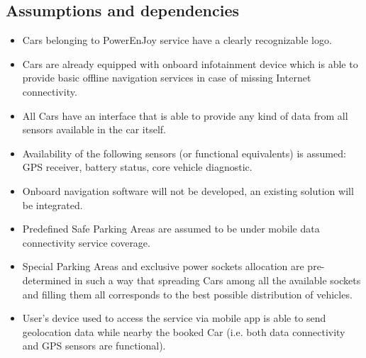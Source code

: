 \subsection{Assumptions and dependencies}
\begin{itemize}
\item Cars belonging to PowerEnJoy service have a clearly recognizable logo.
\item Cars are already equipped with onboard infotainment device which is able to provide basic offline navigation services in case of missing Internet connectivity.
\item All Cars have an interface that is able to provide any kind of data from all sensors available in the car itself.
\item Availability of the following sensors (or functional equivalents) is assumed: GPS receiver, battery status, core vehicle diagnostic.
\item Onboard navigation software will not be developed, an existing solution will be integrated.
\item Predefined Safe Parking Areas are assumed to be under mobile data connectivity service coverage.
\item Special Parking Areas and exclusive power sockets allocation are pre-determined in such a way that spreading Cars among all the available sockets and filling them all corresponds to the best possible distribution of vehicles.
\item User's device used to access the service via mobile app is able to send geolocation data while nearby the booked Car (i.e. both data connectivity and GPS sensors are functional).
\end{itemize}

